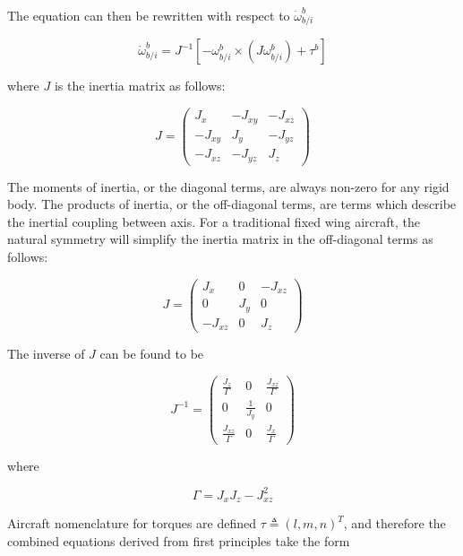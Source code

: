 The equation can then be rewritten with respect to $\dot{\omega}_{b/i}^b$

\begin{equation}
\dot{\omega}_{b/i}^b=J^{-1}\left[-\omega_{b/i}^b\times\left(J\omega_{b/i}^b\right)+\tau^b\right]
\end{equation}

where $J$ is the inertia matrix as follows:

\begin{equation}
J=
 \begin{pmatrix}
 J_x & -J_{xy} & -J_{xz}\\
 -J_{xy} & J_y & -J_{yz}\\
 -J_{xz} & -J_{yz} & J_z
 \end{pmatrix}
\end{equation}

The moments of inertia, or the diagonal terms, are always non-zero for any rigid body.  The products of inertia, or the off-diagonal terms, are terms which describe the inertial coupling between axis.  For a traditional fixed wing aircraft, the natural symmetry will simplify the inertia matrix in the off-diagonal terms as follows:

\begin{equation}
J=
 \begin{pmatrix}
 J_x & 0 & -J_{xz}\\
 0 & J_y & 0\\
 -J_{xz} & 0 & J_z
 \end{pmatrix}
\end{equation}

The inverse of $J$ can be found to be

\begin{equation}
J^{-1}=
 \begin{pmatrix}
 \frac{J_z}{\Gamma} & 0 & \frac{J_{xz}}{\Gamma}\\
 0 & \frac{1}{J_y} & 0\\
 \frac{J_{xz}}{\Gamma} & 0 & \frac{J_x}{\Gamma}
 \end{pmatrix}
\end{equation}

where

\begin{equation}
\Gamma = J_xJ_z-J_{xz}^2
\end{equation}

Aircraft nomenclature for torques are defined $\tau\triangleq(l,m,n)^T$, and therefore the combined equations derived from first principles take the form

